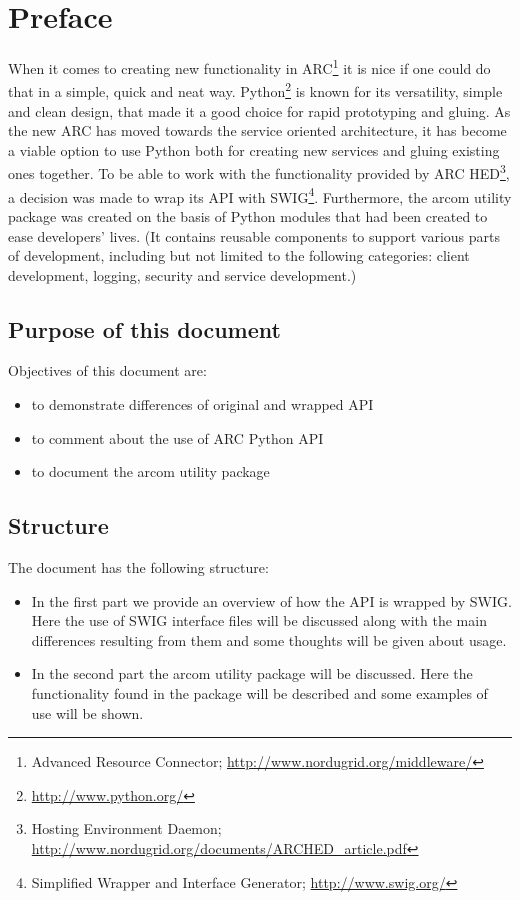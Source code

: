 \documentclass{article}
\begin{document}
\section{Preface}
When it comes to creating new functionality in ARC\footnote{Advanced Resource Connector; \url{http://www.nordugrid.org/middleware/}} 
it is nice if one could do that in a simple, quick and neat way.
Python\footnote{\url{http://www.python.org/}} is known for its versatility, simple and clean design, that
made it a good choice for rapid prototyping and gluing.
As the new ARC has moved towards the service oriented architecture, it has become a viable 
option to use Python both for creating new services and gluing existing ones together.
To be able to work with the functionality provided by ARC HED\footnote{Hosting Environment Daemon; \url{http://www.nordugrid.org/documents/ARCHED\_article.pdf}}, 
a decision was made to wrap its API with SWIG\footnote{Simplified Wrapper and Interface Generator; \url{http://www.swig.org/}}.
Furthermore, the arcom utility package was created on the basis of Python modules 
that had been created to ease developers' lives. (It contains reusable components to support various parts of development, including but not limited to the following categories: client development, logging, security and service development.)

\subsection{Purpose of this document}

Objectives of this document are:

\begin{itemize}

  \item{to demonstrate differences of original and wrapped API}

  \item{to comment about the use of ARC Python API}

  \item{to document the arcom utility package}

\end{itemize}

\subsection{Structure}

The document has the following structure:

\begin{itemize}

  \item{In the first part we provide an overview of how the API is wrapped by SWIG. 
    Here the use of SWIG interface files will be discussed along with the main 
    differences resulting from them and some thoughts will be given about usage.}

  \item{In the second part the arcom utility package will be discussed.
    Here the functionality found in the package will be described and some
    examples of use will be shown.}

\end{itemize}
\end{document}
